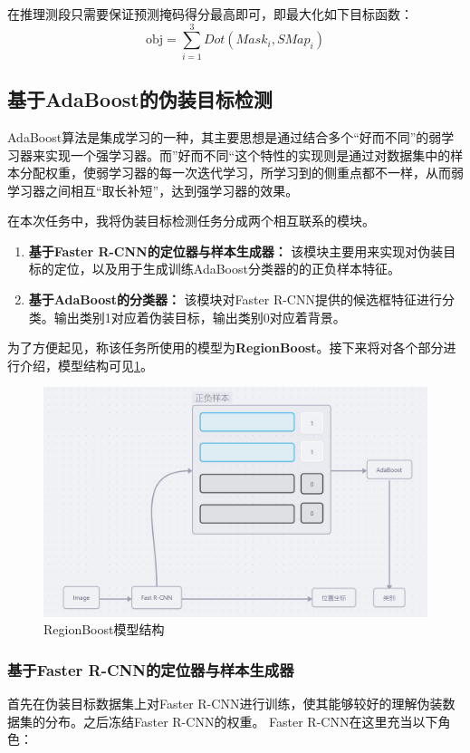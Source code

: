 \documentclass[a4paper,12pt]{ctexart}
\begin{document}
在推理测段只需要保证预测掩码得分最高即可，即最大化如下目标函数：
$$
\text{obj} = \sum_{i=1}^3 Dot(Mask_{i},SMap_{i})
$$


\subsection{基于AdaBoost的伪装目标检测}

AdaBoost算法是集成学习的一种，其主要思想是通过结合多个“好而不同”的弱学习器来实现一个强学习器。而”好而不同“这个特性的实现则是通过对数据集中的样本分配权重，使弱学习器的每一次迭代学习，所学习到的侧重点都不一样，从而弱学习器之间相互“取长补短”，达到强学习器的效果。

在本次任务中，我将伪装目标检测任务分成两个相互联系的模块。
\begin{enumerate}
    \item \textbf{基于Faster R-CNN的定位器与样本生成器：} 该模块主要用来实现对伪装目标的定位，以及用于生成训练AdaBoost分类器的的正负样本特征。
    \item \textbf{基于AdaBoost的分类器：} 该模块对Faster R-CNN提供的候选框特征进行分类。输出类别1对应着伪装目标，输出类别0对应着背景。
\end{enumerate}
为了方便起见，称该任务所使用的模型为\textbf{RegionBoost}。接下来将对各个部分进行介绍，模型结构可见\ref{fig:RegionBoost}。

\begin{figure}[t]
    \centering
    \includegraphics[width=\textwidth]{figures/RegionBoost.png}
    \caption{RegionBoost模型结构\label{fig:RegionBoost}}
\end{figure}

\subsubsection{基于Faster R-CNN的定位器与样本生成器}
首先在伪装目标数据集上对Faster R-CNN进行训练，使其能够较好的理解伪装数据集的分布。之后冻结Faster R-CNN的权重。
Faster R-CNN在这里充当以下角色：
\end{document}
